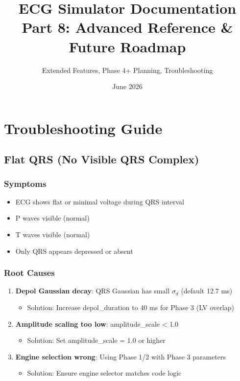\documentclass[11pt, a4paper]{article}
\title{ECG Simulator Documentation\\Part 8: Advanced Reference \& Future Roadmap}
\author{Extended Features, Phase 4+ Planning, Troubleshooting}
\date{June 2026}
\begin{document}
\maketitle
\tableofcontents
\newpage

\section{Troubleshooting Guide}

\subsection{Flat QRS (No Visible QRS Complex)}

\subsubsection{Symptoms}
\begin{itemize}
    \item ECG shows flat or minimal voltage during QRS interval
    \item P waves visible (normal)
    \item T waves visible (normal)
    \item Only QRS appears depressed or absent
\end{itemize}

\subsubsection{Root Causes}
\begin{enumerate}
    \item \textbf{Depol Gaussian decay}: QRS Gaussian has small $\sigma_d$ (default 12.7 ms)
        \begin{itemize}
            \item Solution: Increase depol\_duration to 40 ms for Phase 3 (LV overlap)
        \end{itemize}
    
    \item \textbf{Amplitude scaling too low}: amplitude\_scale < 1.0
        \begin{itemize}
            \item Solution: Set amplitude\_scale = 1.0 or higher
        \end{itemize}
    
    \item \textbf{Engine selection wrong}: Using Phase 1/2 with Phase 3 parameters
        \begin{itemize}
            \item Solution: Ensure engine selector matches code logic
        \end{itemize}
\end{enumerate}
\end{document}
